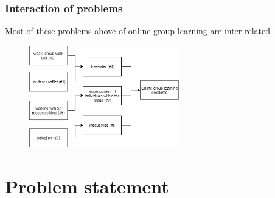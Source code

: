 \documentclass{beamer}
\begin{document}
\begin{frame}
\frametitle{ Interaction of problems }

Most of these problems above of online group learning are inter-related

\begin{figure}
\includegraphics[width=65mm]{p21.png}
\end{figure}






\end{frame}
\section{Problem statement} %
\end{document}
